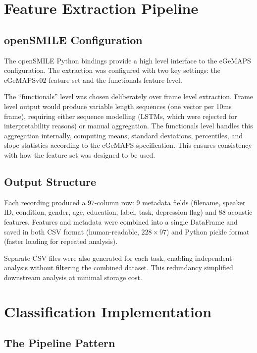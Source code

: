 \section{Feature Extraction Pipeline}

\subsection{openSMILE Configuration}

The openSMILE Python bindings provide a high level interface to the eGeMAPS configuration. The extraction was configured with two key settings: the eGeMAPSv02 feature set and the functionals feature level.

The ``functionals'' level was chosen deliberately over frame level extraction. Frame level output would produce variable length sequences (one vector per 10ms frame), requiring either sequence modelling (LSTMs, which were rejected for interpretability reasons) or manual aggregation. The functionals level handles this aggregation internally, computing means, standard deviations, percentiles, and slope statistics according to the eGeMAPS specification. This ensures consistency with how the feature set was designed to be used.

\subsection{Output Structure}

Each recording produced a 97-column row: 9 metadata fields (filename, speaker ID, condition, gender, age, education, label, task, depression flag) and 88 acoustic features. Features and metadata were combined into a single DataFrame and saved in both CSV format (human-readable, $228 \times 97$) and Python pickle format (faster loading for repeated analysis).

Separate CSV files were also generated for each task, enabling independent analysis without filtering the combined dataset. This redundancy simplified downstream analysis at minimal storage cost.

\section{Classification Implementation}

\subsection{The Pipeline Pattern}

